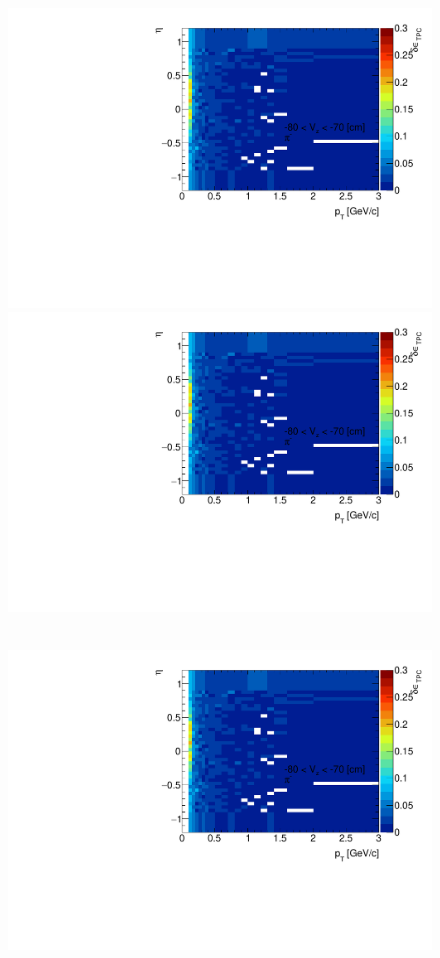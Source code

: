 \begin{figure}[hb]
{		\includegraphics[width=\linewidth,page=55]{graphics/systematicsEfficiency/deadMaterial/secondaries_Unbinned_CD_.pdf}\\
		\includegraphics[width=\linewidth,page=58]{graphics/systematicsEfficiency/deadMaterial/secondaries_Unbinned_CD_.pdf}\\
	}~
	\parbox{0.325\textwidth}{
		\centering
		\includegraphics[width=\linewidth,page=50]{graphics/systematicsEfficiency/deadMaterial/secondaries_Unbinned_CD_.pdf}\\
}
\end{figure}
